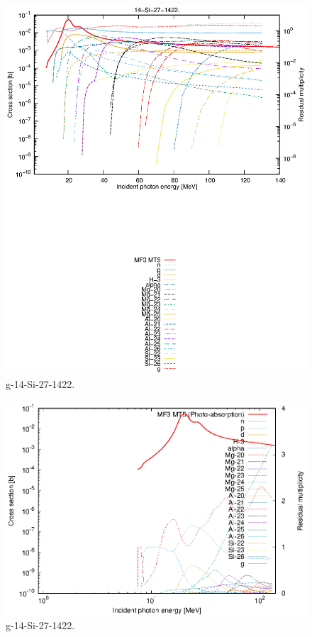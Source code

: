 \begin{figure}
 \includegraphics[width=\linewidth]{eps/g_14-Si-27_1422.eps}
  \caption{g-14-Si-27-1422.}
\end{figure}
\newpage \clearpage

\begin{figure}
 \includegraphics[width=\linewidth]{eps-log/g_14-Si-27_1422.eps}
 \caption{g-14-Si-27-1422.}
\end{figure}
\newpage \clearpage

